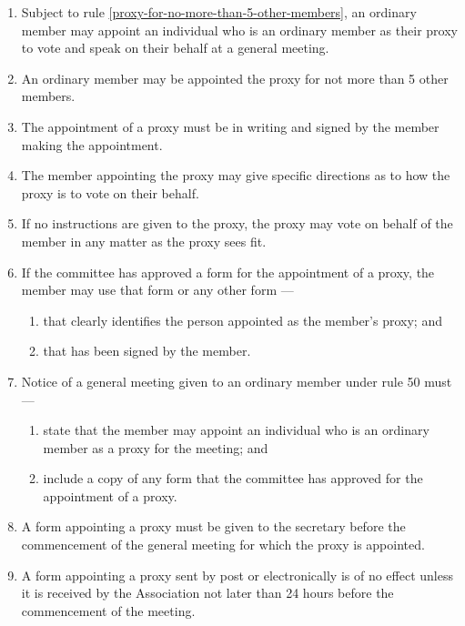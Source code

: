 \documentclass[../constitution.tex]{subfiles}
\begin{document}
\begin{enumerate}

\item Subject to rule \ref{proxy-for-no-more-than-5-other-members}, an ordinary member may appoint an individual who is an ordinary member as their proxy to vote and speak on their behalf at a general meeting.
\item An ordinary member may be appointed the proxy for not more than 5 other members. \label{proxy-for-no-more-than-5-other-members}
\item The appointment of a proxy must be in writing and signed by the member making the appointment.
\item The member appointing the proxy may give specific directions as to how the proxy is to vote on their behalf.
\item If no instructions are given to the proxy, the proxy may vote on behalf of the member in any matter as the proxy sees fit.
\item If the committee has approved a form for the appointment of a proxy, the member may use that form or any other form ---

  \begin{enumerate}
  
  \item that clearly identifies the person appointed as the member's proxy; and
  \item that has been signed by the member.
  \end{enumerate}
\item Notice of a general meeting given to an ordinary member under rule 50 must ---  \label{notice-of-meeting-to-appointed-proxy}

  \begin{enumerate}
  
  \item state that the member may appoint an individual who is an ordinary member as a proxy for the meeting; and
  \item include a copy of any form that the committee has approved for the appointment of a proxy.
  \end{enumerate}
\item A form appointing a proxy must be given to the secretary before the commencement of the general meeting for which the proxy is appointed. \label{form-appointing-proxy-before-general-meeting}
\item A form appointing a proxy sent by post or electronically is of no effect unless it is received by the Association not later than 24 hours before the commencement of the meeting.
\end{enumerate}
\end{document}
